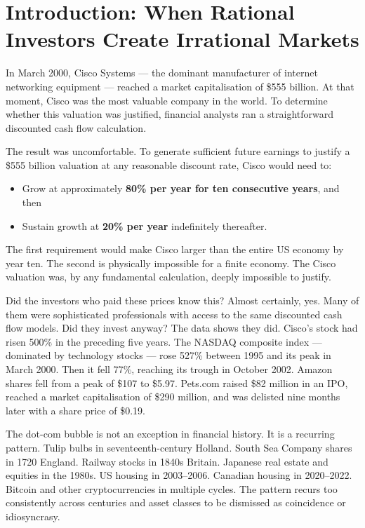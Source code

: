 \documentclass[12pt, letterpaper]{article}
\begin{document}
\medskip


\section*{Introduction: When Rational Investors Create Irrational Markets}


In March 2000, Cisco Systems --- the dominant manufacturer of internet networking equipment --- reached a market capitalisation of \$555 billion. At that moment, Cisco was the most valuable company in the world. To determine whether this valuation was justified, financial analysts ran a straightforward discounted cash flow calculation.

The result was uncomfortable. To generate sufficient future earnings to justify a \$555 billion valuation at any reasonable discount rate, Cisco would need to:
\begin{itemize}
\item Grow at approximately \textbf{80\% per year for ten consecutive years}, and then
\item Sustain growth at \textbf{20\% per year} indefinitely thereafter.
\end{itemize}

The first requirement would make Cisco larger than the entire US economy by year ten. The second is physically impossible for a finite economy. The Cisco valuation was, by any fundamental calculation, deeply impossible to justify.

Did the investors who paid these prices know this? Almost certainly, yes. Many of them were sophisticated professionals with access to the same discounted cash flow models. Did they invest anyway? The data shows they did. Cisco's stock had risen 500\% in the preceding five years. The NASDAQ composite index --- dominated by technology stocks --- rose 527\% between 1995 and its peak in March 2000. Then it fell 77\%, reaching its trough in October 2002. Amazon shares fell from a peak of \$107 to \$5.97. Pets.com raised \$82 million in an IPO, reached a market capitalisation of \$290 million, and was delisted nine months later with a share price of \$0.19.

The dot-com bubble is not an exception in financial history. It is a recurring pattern. Tulip bulbs in seventeenth-century Holland. South Sea Company shares in 1720 England. Railway stocks in 1840s Britain. Japanese real estate and equities in the 1980s. US housing in 2003--2006. Canadian housing in 2020--2022. Bitcoin and other cryptocurrencies in multiple cycles. The pattern recurs too consistently across centuries and asset classes to be dismissed as coincidence or idiosyncrasy.
\end{document}
